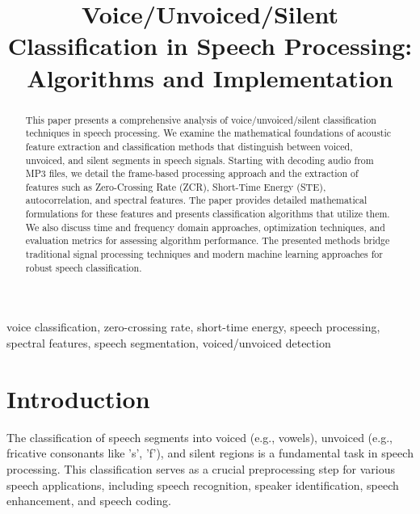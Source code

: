 \documentclass[10pt,journal,compsoc]{IEEEtran}
\begin{document}
\title{Voice/Unvoiced/Silent Classification in Speech Processing: Algorithms and Implementation}


\maketitle

\begin{abstract}
This paper presents a comprehensive analysis of voice/unvoiced/silent classification techniques in speech processing. We examine the mathematical foundations of acoustic feature extraction and classification methods that distinguish between voiced, unvoiced, and silent segments in speech signals. Starting with decoding audio from MP3 files, we detail the frame-based processing approach and the extraction of features such as Zero-Crossing Rate (ZCR), Short-Time Energy (STE), autocorrelation, and spectral features. The paper provides detailed mathematical formulations for these features and presents classification algorithms that utilize them. We also discuss time and frequency domain approaches, optimization techniques, and evaluation metrics for assessing algorithm performance. The presented methods bridge traditional signal processing techniques and modern machine learning approaches for robust speech classification.
\end{abstract}

\begin{IEEEkeywords}
voice classification, zero-crossing rate, short-time energy, speech processing, spectral features, speech segmentation, voiced/unvoiced detection
\end{IEEEkeywords}

\section{Introduction}
The classification of speech segments into voiced (e.g., vowels), unvoiced (e.g., fricative consonants like 's', 'f'), and silent regions is a fundamental task in speech processing. This classification serves as a crucial preprocessing step for various speech applications, including speech recognition, speaker identification, speech enhancement, and speech coding.
\end{document}
